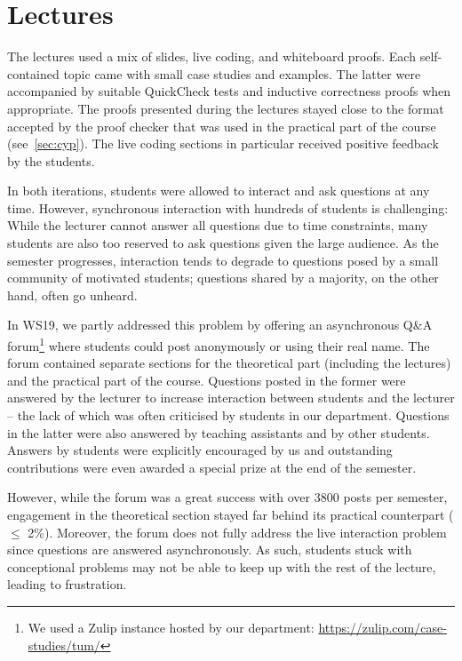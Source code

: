 \section{Lectures}\label{sec:lectures}

The lectures used a mix of
slides,
live coding, and whiteboard proofs.
Each self-contained topic came with small case studies and examples.
The latter were accompanied by suitable QuickCheck tests
and inductive correctness proofs when appropriate.
The proofs presented during the lectures stayed close to the format accepted by the proof checker that was used in the practical part of the course (see~\cref{sec:cyp}).
The live coding sections in particular received positive feedback by the students.

In both iterations, students were allowed to interact and ask questions at any time.
However, synchronous interaction with hundreds of students is challenging:
While the lecturer cannot answer all questions due to time constraints,
many students are also too reserved to ask questions given the large audience.
As the semester progresses, interaction tends to degrade to
questions posed by a small community of motivated students;
questions shared by a majority, on the other hand, often go unheard.

In WS19, we partly addressed this problem by offering an asynchronous Q\&A forum\footnote{We used a Zulip instance hosted by our department: \url{https://zulip.com/case-studies/tum/}}
where students could post anonymously or using their real name.
The forum contained separate sections for the theoretical part (including the lectures)
and the practical part of the course.
Questions posted in the former were answered by the lecturer
to increase interaction between students and the lecturer -- the lack of which was often criticised by students in our department.
Questions in the latter were also answered by teaching assistants and by other students.
Answers by students were explicitly encouraged by us and
outstanding contributions were even awarded a special prize at the end of the semester.

However, while the forum was a great success with over 3800 posts per semester,
engagement in the theoretical section stayed far behind its practical counterpart ($\leq$ 2\%).
Moreover, the forum does not fully address the live interaction problem since
questions are answered asynchronously.
As such, students stuck with conceptional problems may not be able
to keep up with the rest of the lecture,
leading to frustration.


